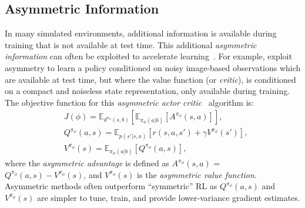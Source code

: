 \subsection{Asymmetric Information}
In many simulated environments, additional information is available during training that is not available at test time.  This additional \emph{asymmetric information} can often be exploited to accelerate learning~\citep{choudhury2018data, pinto2017asymmetric, vapnik2009new}. For example, \citet{pinto2017asymmetric} exploit asymmetry to learn a policy conditioned on noisy image-based observations which are available at test time, but where the value function (or \emph{critic}), is conditioned on a compact and noiseless state representation, only available during training.  The objective function for this \emph{asymmetric actor critic}~\citep{pinto2017asymmetric} algorithm is:
\begin{align}
    &J(\phi) = \mathbb{E}_{d^{\pi_{\phi}}(s,b)}\left[ \mathbb{E}_{\pi_{\phi}(a | b)}  \left[ A^{\pi_{\phi}}(s , a) \right] \right],  \\
    & Q^{\pi_{\phi}} (a, s) = \mathbb{E}_{p(s'|s,a)} \left[ r(s,a,s') + \gamma V^{\pi_{\phi}}(s') \right], \\ 
    &V^{\pi_{\phi}}(s) = \mathbb{E}_{\pi_{\phi}(a | b)} \left[ Q^{\pi_{\phi}} (a, s) \right], \label{equ:background:qv_b}
\end{align}
where the \emph{asymmetric advantage} is defined as $A^{\pi_{\phi}}(s , a)$ = $Q^{\pi_{\phi}}(a,s) - V^{\pi_{\phi}}(s)$, and $V^{\pi_{\phi}}(s)$ is the \emph{asymmetric value function}.  Asymmetric methods often outperform ``symmetric'' RL as $Q^{\pi_{\phi}}(a,s)$ and $V^{\pi_{\phi}}(s)$ are simpler to tune, train, and provide lower-variance gradient estimates. 

